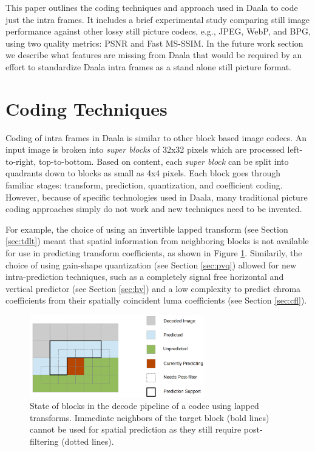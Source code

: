 \documentclass[conference, 10pt]{IEEEtran}
\begin{document}
This paper outlines the coding techniques and approach used in Daala to code
 just the intra frames.
It includes a brief experimental study comparing still image performance
 against other lossy still picture codecs, e.g., JPEG, WebP, and BPG, using
 two quality metrics: PSNR and Fast MS-SSIM\cite{Chen2010}.
In the future work section we describe what features are missing from Daala
 that would be required by an effort to standardize Daala intra frames as a
 stand alone still picture format.

\section{Coding Techniques}

Coding of intra frames in Daala is similar to other block based image codecs.
An input image is broken into {\em super blocks} of 32x32 pixels which are
 processed left-to-right, top-to-bottom.
Based on content, each {\em super block} can be split into quadrants down
 to blocks as small as 4x4 pixels.
Each block goes through familiar stages: transform, prediction, quantization,
 and coefficient coding.
However, because of specific technologies used in Daala, many traditional
 picture coding approaches simply do not work and new techniques need to
 be invented.

For example, the choice of using an invertible lapped transform (see Section
 \ref{sec:tdlt}) meant that spatial information from neighboring blocks is not
 available for use in predicting transform coefficients, as shown in Figure
 \ref{fig:decode}.
Similarily, the choice of using gain-shape quantization (see Section \ref{sec:pvq})
 allowed for new intra-prediction techniques, such as a completely signal free
 horizontal and vertical predictor (see Section \ref{sec:hv}) and a low
 complexity to predict chroma coefficients from their spatially coincident
 luma coefficients (see Section \ref{sec:cfl}).

\begin{figure}[h]
\begin{center}
\noindent
  \includegraphics[natwidth=1376,natheight=646,width=3in]{daala_decode.png}
  \caption[example]{\label{fig:decode} State of blocks in the decode pipeline of
   a codec using lapped transforms. Immediate neighbors of the target block
   (bold lines) cannot be used for spatial prediction as they still require
   post-filtering (dotted lines).}
\end{center}
\end{figure}
\end{document}
